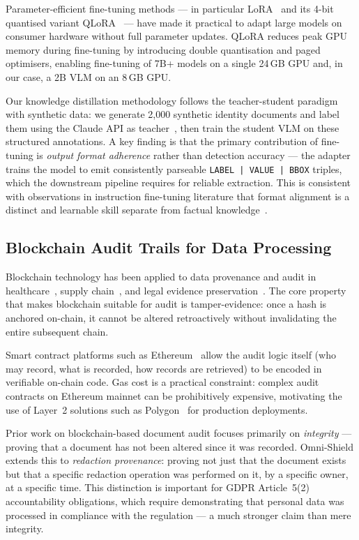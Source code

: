 Parameter-efficient fine-tuning methods --- in
particular LoRA~\cite{hu2022lora} and its
4-bit quantised variant QLoRA~\cite{dettmers2023qlora}
--- have made it practical to adapt large models on
consumer hardware without full parameter updates.
QLoRA reduces peak GPU memory during fine-tuning by
introducing double quantisation and paged optimisers,
enabling fine-tuning of 7B+ models on a single 24\,GB
GPU and, in our case, a 2B VLM on an 8\,GB GPU.

Our knowledge distillation methodology follows the
teacher-student paradigm with synthetic data:
we generate 2,000 synthetic identity documents and
label them using the Claude API as teacher~\cite{anthropic2024},
then train the student VLM on these structured
annotations.
A key finding is that the primary contribution of
fine-tuning is \emph{output format adherence} rather
than detection accuracy --- the adapter trains the
model to emit consistently parseable
\texttt{LABEL\,|\,VALUE\,|\,BBOX} triples, which the
downstream pipeline requires for reliable extraction.
This is consistent with observations in instruction
fine-tuning literature that format alignment is a
distinct and learnable skill separate from factual
knowledge~\cite{ouyang2022instructgpt}.

\subsection{Blockchain Audit Trails for Data Processing}

Blockchain technology has been applied to data
provenance and audit in healthcare~\cite{xia2017medshare},
supply chain~\cite{Casino2019}, and
legal evidence preservation~\cite{zhu2019blockchain}.
The core property that makes blockchain suitable for
audit is tamper-evidence: once a hash is anchored
on-chain, it cannot be altered retroactively without
invalidating the entire subsequent chain.

Smart contract platforms such as
Ethereum~\cite{buterin2014ethereum} allow the audit
logic itself (who may record, what is recorded, how
records are retrieved) to be encoded in verifiable
on-chain code.
Gas cost is a practical constraint: complex audit
contracts on Ethereum mainnet can be prohibitively
expensive, motivating the use of Layer~2 solutions such
as Polygon~\cite{polygon2021} for production deployments.

Prior work on blockchain-based document audit focuses
primarily on \emph{integrity} --- proving that a
document has not been altered since it was recorded.
Omni-Shield extends this to \emph{redaction
provenance}: proving not just that the document exists
but that a specific redaction operation was performed
on it, by a specific owner, at a specific time.
This distinction is important for GDPR Article~5(2)
accountability obligations, which require demonstrating
that personal data was processed in compliance with
the regulation --- a much stronger claim than mere
integrity.

